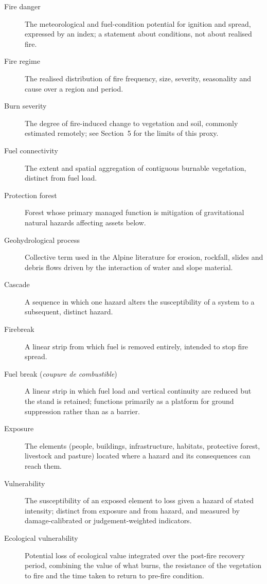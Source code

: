 \documentclass[11pt,a4paper]{article}
\begin{document}
\begin{description}
    \item[Fire danger] The meteorological and fuel-condition potential for ignition and spread, expressed by an index; a statement about conditions, not about realised fire.
    \item[Fire regime] The realised distribution of fire frequency, size, severity, seasonality and cause over a region and period.
    \item[Burn severity] The degree of fire-induced change to vegetation and soil, commonly estimated remotely; see Section~5 for the limits of this proxy.
    \item[Fuel connectivity] The extent and spatial aggregation of contiguous burnable vegetation, distinct from fuel load.
    \item[Protection forest] Forest whose primary managed function is mitigation of gravitational natural hazards affecting assets below.
    \item[Geohydrological process] Collective term used in the Alpine literature for erosion, rockfall, slides and debris flows driven by the interaction of water and slope material.
    \item[Cascade] A sequence in which one hazard alters the susceptibility of a system to a subsequent, distinct hazard.
    \item[Firebreak] A linear strip from which fuel is removed entirely, intended to stop fire spread.
    \item[Fuel break (\emph{coupure de combustible})] A linear strip in which fuel load and vertical continuity are reduced but the stand is retained; functions primarily as a platform for ground suppression rather than as a barrier.
    \item[Exposure] The elements (people, buildings, infrastructure, habitats, protective forest, livestock and pasture) located where a hazard and its consequences can reach them.
    \item[Vulnerability] The susceptibility of an exposed element to loss given a hazard of stated intensity; distinct from exposure and from hazard, and measured by damage-calibrated or judgement-weighted indicators.
    \item[Ecological vulnerability] Potential loss of ecological value integrated over the post-fire recovery period, combining the value of what burns, the resistance of the vegetation to fire and the time taken to return to pre-fire condition.
\end{description}



\end{document}
